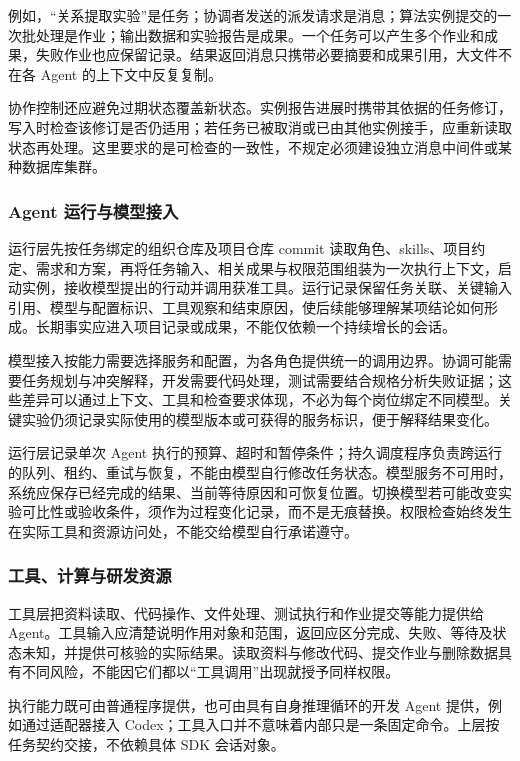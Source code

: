 \documentclass[11pt,a4paper]{article}
\begin{document}
例如，“关系提取实验”是任务；协调者发送的派发请求是消息；算法实例提交的一次批处理是作业；输出数据和实验报告是成果。一个任务可以产生多个作业和成果，失败作业也应保留记录。结果返回消息只携带必要摘要和成果引用，大文件不在各 Agent 的上下文中反复复制。

协作控制还应避免过期状态覆盖新状态。实例报告进展时携带其依据的任务修订，写入时检查该修订是否仍适用；若任务已被取消或已由其他实例接手，应重新读取状态再处理。这里要求的是可检查的一致性，不规定必须建设独立消息中间件或某种数据库集群。

\subsubsection{Agent 运行与模型接入}

运行层先按任务绑定的组织仓库及项目仓库 commit 读取角色、skills、项目约定、需求和方案，再将任务输入、相关成果与权限范围组装为一次执行上下文，启动实例，接收模型提出的行动并调用获准工具。运行记录保留任务关联、关键输入引用、模型与配置标识、工具观察和结束原因，使后续能够理解某项结论如何形成。长期事实应进入项目记录或成果，不能仅依赖一个持续增长的会话。

模型接入按能力需要选择服务和配置，为各角色提供统一的调用边界。协调可能需要任务规划与冲突解释，开发需要代码处理，测试需要结合规格分析失败证据；这些差异可以通过上下文、工具和检查要求体现，不必为每个岗位绑定不同模型。关键实验仍须记录实际使用的模型版本或可获得的服务标识，便于解释结果变化。

运行层记录单次 Agent 执行的预算、超时和暂停条件；持久调度程序负责跨运行的队列、租约、重试与恢复，不能由模型自行修改任务状态。模型服务不可用时，系统应保存已经完成的结果、当前等待原因和可恢复位置。切换模型若可能改变实验可比性或验收条件，须作为过程变化记录，而不是无痕替换。权限检查始终发生在实际工具和资源访问处，不能交给模型自行承诺遵守。

\subsubsection{工具、计算与研发资源}

工具层把资料读取、代码操作、文件处理、测试执行和作业提交等能力提供给 Agent。工具输入应清楚说明作用对象和范围，返回应区分完成、失败、等待及状态未知，并提供可核验的实际结果。读取资料与修改代码、提交作业与删除数据具有不同风险，不能因它们都以“工具调用”出现就授予同样权限。

执行能力既可由普通程序提供，也可由具有自身推理循环的开发 Agent 提供，例如通过适配器接入 Codex；工具入口并不意味着内部只是一条固定命令。上层按任务契约交接，不依赖具体 SDK 会话对象。
\end{document}
